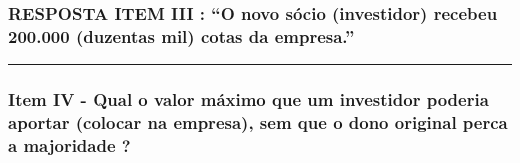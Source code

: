 \documentclass[
]{book}
\begin{document}
\subsubsection{RESPOSTA ITEM III : ``O novo sócio (investidor) recebeu 200.000 (duzentas mil) cotas da empresa.''}\label{resposta-item-iii-o-novo-suxf3cio-investidor-recebeu-200.000-duzentas-mil-cotas-da-empresa.}

\begin{center}\rule{0.5\linewidth}{0.5pt}\end{center}

\subsubsection{Item IV - Qual o valor máximo que um investidor poderia aportar (colocar na empresa), sem que o dono original perca a majoridade ?}\label{item-iv---qual-o-valor-muxe1ximo-que-um-investidor-poderia-aportar-colocar-na-empresa-sem-que-o-dono-original-perca-a-majoridade}
\end{document}
